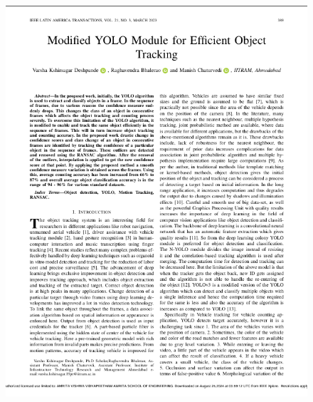 \begin{figure}[h!]
    \centering
    \includegraphics[width=1\textwidth]{reference_papers/Paper_4.png}
\end{figure}
%
%
%
